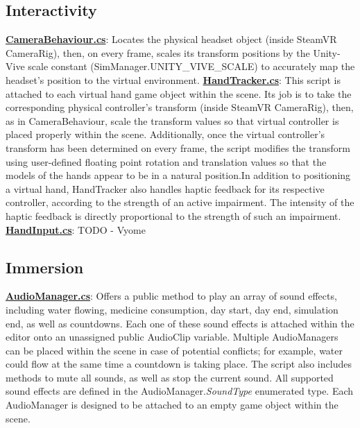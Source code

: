 \documentclass{article}
\begin{document}
\subsection*{Interactivity} %
\href{https://bit.ly/2Th9Ey3}{\textbf{CameraBehaviour.cs}}: Locates the physical headset object (inside SteamVR CameraRig), then, on every frame, scales its transform positions by the Unity-Vive scale constant (SimManager.UNITY\_VIVE\_SCALE) to accurately map the headset's position to the virtual environment. \newline \newline
\href{https://bit.ly/2U3xT7n}{\textbf{HandTracker.cs}}: This script is attached to each virtual hand game object within the scene. Its job is to take the corresponding physical controller's transform (inside SteamVR CameraRig), then, as in CameraBehaviour, scale the transform values so that virtual controller is placed properly within the scene. Additionally, once the virtual controller's transform has been determined on every frame, the script modifies the transform using user-defined floating point rotation and translation values so that the models of the hands appear to be in a natural position.\newline In addition to positioning a virtual hand, HandTracker also handles haptic feedback for its respective controller, according to the strength of an active impairment. The intensity of the haptic feedback is directly proportional to the strength of such an impairment. \newline \newline
\href{https://bit.ly/2TOMwMq}{\textbf{HandInput.cs}}: TODO - Vyome


\subsection*{Immersion} %
\href{https://bit.ly/2HHzDwj}{\textbf{AudioManager.cs}}: Offers a public method to play an array of sound effects, including water flowing, medicine consumption, day start, day end, simulation end, as well as countdowns. Each one of these sound effects is attached within the editor onto an unassigned public AudioClip variable. Multiple AudioManagers can be placed within the scene in case of potential conflicts; for example, water could flow at the same time a countdown is taking place. The script also includes methods to mute all sounds, as well as stop the current sound. All supported sound effects are defined in the AudioManager.\textit{SoundType} enumerated type. Each AudioManager is designed to be attached to an empty game object within the scene.
\end{document}
